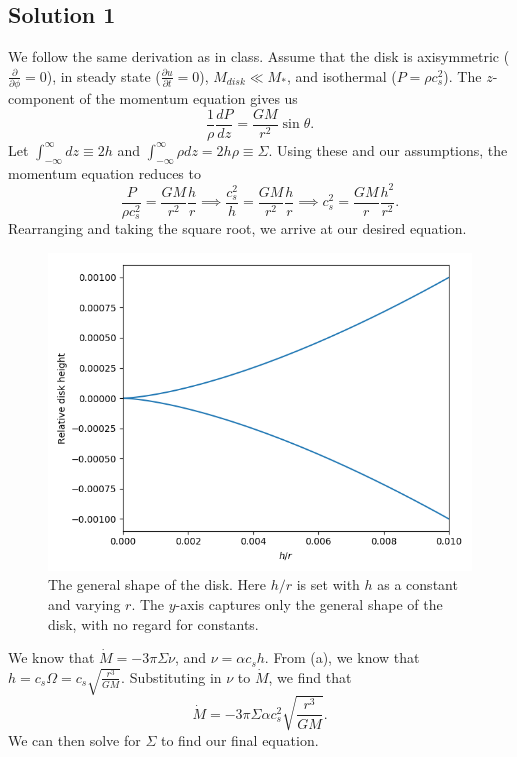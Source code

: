 \documentclass[11pt]{article}
\newenvironment{tight_enumerate}{
    \begin{enumerate}[label=(\alph*)]
    \setlength{\itemsep}{3pt}
    \setlength{\parskip}{0pt}}
    {\end{enumerate}}
\begin{document}
\subsection*{Solution 1}
\begin{tight_enumerate}
\item We follow the same derivation as in class. Assume that the disk is axisymmetric ($\frac{\partial}{\partial\phi} = 0$), in steady state ($\frac{\partial{u}}{\partial{t}} = 0$), $M_{disk} \ll M_{*}$, and isothermal ($P = \rho{c_s^2}$). The $z$-component of the momentum equation gives us 
\[\frac{1}{\rho}\frac{dP}{dz} = \frac{GM}{r^{2}}\sin\theta.\]
Let $\int_{-\infty}^{\infty}dz \equiv 2h$ and $\int_{-\infty}^{\infty}{\rho}dz = 2h\rho \equiv \Sigma$. Using these and our assumptions, the momentum equation reduces to 
\[\frac{P}{{\rho}c_s^2} = \frac{GM}{r^2}\frac{h}{r} \implies \frac{c_s^2}{h} = \frac{GM}{r^2}\frac{h}{r} \implies c_s^2 = \frac{GM}{r}\frac{h^2}{r^2}.\]
Rearranging and taking the square root, we arrive at our desired equation.\\

\begin{figure}[H]
\centering
\includegraphics[height=0.275\textheight]{disk.png}
\vspace{-1em}
\caption{The general shape of the disk. Here $h/r$ is set with $h$ as a constant and varying $r$. The $y$-axis captures only the general shape of the disk, with no regard for constants.}
\end{figure}

\item We know that $\dot{M} = -3\pi\Sigma\nu$, and $\nu = \alpha{c_s}h$. From (a), we know that $h = c_{s}\Omega = c_{s}\sqrt{\frac{r^3}{GM}}$. Substituting in $\nu$ to $\dot{M}$, we find that 
\[\dot{M} = -3\pi\Sigma\alpha{c_s^2}\sqrt{\frac{r^3}{GM}}.\]
We can then solve for $\Sigma$ to find our final equation.\\


\end{tight_enumerate}
\end{document}
